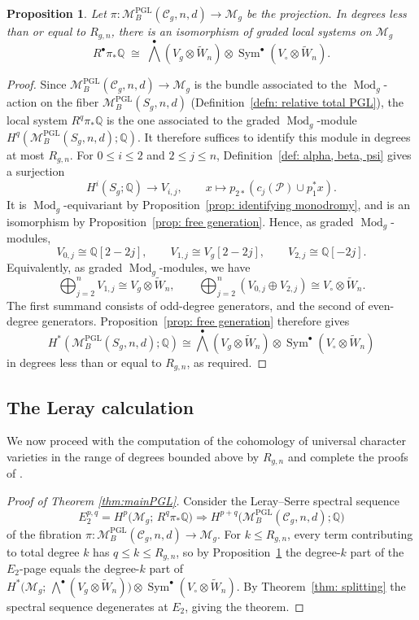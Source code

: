 \documentclass[11pt,reqno]{amsart}
\theoremstyle{plain} %
\newtheorem{prop}[theorem]{Proposition}
\theoremstyle{definition}
\newcommand{\QQ}{\mathbb{Q}}
\newcommand{\M}{\mathcal{M}}
\newcommand{\C}{\mathcal{C}}
\newcommand{\mc}{\mathcal}
\DeclareMathOperator{\PGL}{PGL}
\DeclareMathOperator{\Mod}{Mod}
\DeclareMathOperator{\Sym}{Sym}
\newcommand{\tW}{\widetilde{W}}
\begin{document}
\begin{prop} \label{prop: monodromy action}
Let $\pi \colon \M_B^{\PGL}(\C_g,n,d) \to \M_g$ be the projection. In degrees less than or equal to $R_{g,n}$, there is an isomorphism of graded local systems on $\M_g$
\[
R^\bullet \pi_* \QQ \;\cong\; \textstyle{\bigwedge^\bullet}(V_g \otimes \tW_n) \otimes \Sym^\bullet(V_\circ \otimes \tW_n).
\]
\end{prop}

\begin{proof}
Since $\M_B^{\PGL}(\C_g,n,d)\to\M_g$ is the bundle associated to the $\Mod_g$-action on the fiber $\M_B^{\PGL}(S_g,n,d)$ (Definition~\ref{defn: relative total PGL}), the local system $R^q\pi_*\QQ$ is the one associated to the graded $\Mod_g$-module $H^q(\M_B^{\PGL}(S_g,n,d);\QQ)$. It therefore suffices to identify this module in degrees at most $R_{g,n}$.
For $0\le i\le 2$ and $2\le j\le n$, Definition~\ref{def: alpha, beta, psi} gives a surjection
\[
H^i(S_g;\QQ)\longrightarrow V_{i,j},
\qquad
x\longmapsto p_{2*}(c_j(\mc P)\cup p_1^*x).
\]
It is $\Mod_g$-equivariant by Proposition~\ref{prop: identifying monodromy}, and is an isomorphism by Proposition~\ref{prop: free generation}. Hence, as graded $\Mod_g$-modules,
\[
V_{0,j}\cong \QQ[2-2j],\qquad
V_{1,j}\cong V_g[2-2j],\qquad
V_{2,j}\cong \QQ[-2j].
\]
Equivalently, as graded $\Mod_g$-modules, we have
\[
\bigoplus_{j=2}^n V_{1,j}\cong V_g\otimes \tW_n,
\qquad
\bigoplus_{j=2}^n(V_{0,j}\oplus V_{2,j})\cong V_\circ\otimes \tW_n.
\]
The first summand consists of odd-degree generators, and the second of even-degree generators. Proposition~\ref{prop: free generation} therefore gives
\[
H^*(\M_B^{\PGL}(S_g,n,d);\QQ)\cong
\textstyle{\bigwedge^\bullet}(V_g\otimes \tW_n)
\otimes
\Sym^\bullet(V_\circ\otimes \tW_n)
\]
in degrees less than or equal to $R_{g,n}$, as required. 
\end{proof}

\subsection{The Leray calculation} \label{subsec: leray}

We now proceed with the computation of the cohomology of universal character varieties in the range of degrees bounded above by $R_{g,n}$ and complete the proofs of .

\begin{proof}[Proof of Theorem \ref{thm:mainPGL}]
Consider the Leray--Serre spectral sequence
\[
E_2^{p,q} = H^p\big(\M_g;\, R^q\pi_*\QQ\big) \Longrightarrow H^{p+q}\big(\M_B^{\PGL}(\C_g,n,d);\QQ\big)
\]
of the fibration $\pi \colon \M_B^{\PGL}(\C_g,n,d) \to \M_g$. For $k \le R_{g,n}$, every term contributing to total degree $k$ has $q \le k \le R_{g,n}$, so by Proposition~\ref{prop: monodromy action} the degree-$k$ part of the $E_2$-page equals the degree-$k$ part of $H^*\big(\M_g;\, \bigwedge^\bullet(V_g \otimes \tW_n)\big) \otimes \Sym^\bullet(V_\circ \otimes \tW_n)$. By Theorem~\ref{thm: splitting} the spectral sequence degenerates at $E_2$, giving the theorem. 
\end{proof}
\end{document}

